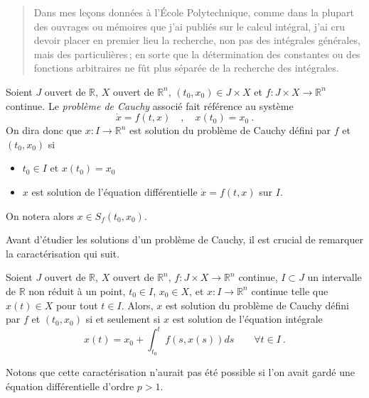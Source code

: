 \begin{quote}
Dans mes leçons données à l'École Polytechnique, comme dans la plupart
des ouvrages ou mémoires que j'ai publiés sur le calcul intégral, j'ai
cru devoir placer en premier lieu la recherche, non pas des intégrales
générales, mais des particulières\,; en sorte que la détermination des
constantes ou des fonctions arbitraires ne fût plus séparée de la
recherche des intégrales.
\end{quote}


\hypertarget{def_cauchy}{}
\begin{definition}\label{def_cauchy}
Soient \(J\) ouvert de \(\mathbb{R}\), \(X\) ouvert de
\(\mathbb{R}^{n}\), \((t_0,x_0)\in J\times X\) et
\(f: J\times X \to \mathbb{R}^n\) continue. Le \emph{problème de Cauchy}
associé fait référence au système \[
\dot{x}=f(t,x) \quad , \quad x(t_0)=x_0 \ .
\] On dira donc que \(x:I\to \mathbb{R}^n\) est solution du problème de
Cauchy défini par \(f\) et \((t_0,x_0)\) si

\begin{itemize}
\item
  \(t_0\in I\) et \(x(t_0)=x_0\)
\item
  \(x\) est solution de l'équation différentielle \(\dot{x}=f(t,x)\) sur
  \(I\).
\end{itemize}

On notera alors \(x\in S_f(t_0,x_0)\).
\end{definition}

Avant d'étudier les solutions d'un problème de Cauchy, il est crucial de
remarquer la caractérisation qui suit.

\hypertarget{theo_eq_integrale}{}
\begin{theoreme}\label{theo_eq_integrale}
Soient \(J\) ouvert de \(\mathbb{R}\), \(X\) ouvert de
\(\mathbb{R}^{n}\), \(f: J\times X \to \mathbb{R}^n\) continue,
\(I\subset J\) un intervalle de \(\mathbb{R}\) non réduit à un point,
\(t_0\in I\), \(x_0\in X\), et \(x: I\to \mathbb{R}^n\) continue telle
que \(x(t)\in X\) pour tout \(t\in I\). Alors, \(x\) est solution du
problème de Cauchy défini par \(f\) et \((t_0,x_0)\) si et seulement si
\(x\) est solution de l'équation intégrale \[
x(t) = x_0 + \int_{t_0}^t f(s,x(s))ds \qquad \forall t\in I \ .
\]
\end{theoreme}
Notons que cette caractérisation n'aurait pas été possible si l'on avait
gardé une équation différentielle d'ordre \(p>1\).


